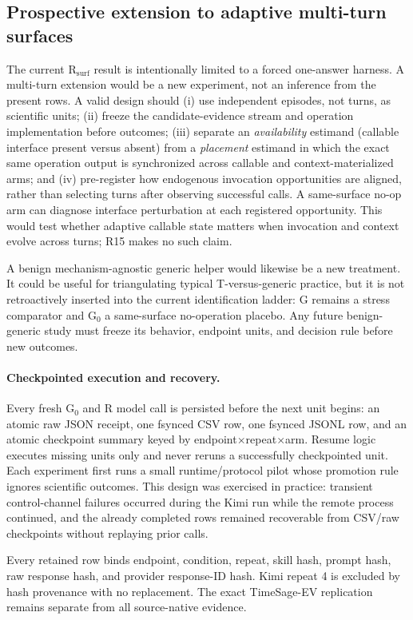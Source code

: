 \subsection{Prospective extension to adaptive multi-turn surfaces}
The current R$_{\mathrm{surf}}$ result is intentionally limited to a forced one-answer harness. A multi-turn extension would be a new experiment, not an inference from the present rows. A valid design should (i) use independent episodes, not turns, as scientific units; (ii) freeze the candidate-evidence stream and operation implementation before outcomes; (iii) separate an \emph{availability} estimand (callable interface present versus absent) from a \emph{placement} estimand in which the exact same operation output is synchronized across callable and context-materialized arms; and (iv) pre-register how endogenous invocation opportunities are aligned, rather than selecting turns after observing successful calls. A same-surface no-op arm can diagnose interface perturbation at each registered opportunity. This would test whether adaptive callable state matters when invocation and context evolve across turns; R15 makes no such claim.

A benign mechanism-agnostic generic helper would likewise be a new treatment. It could be useful for triangulating typical T-versus-generic practice, but it is not retroactively inserted into the current identification ladder: G remains a stress comparator and G$_0$ a same-surface no-operation placebo. Any future benign-generic study must freeze its behavior, endpoint units, and decision rule before new outcomes.

\paragraph{Checkpointed execution and recovery.}
Every fresh G$_0$ and R model call is persisted before the next unit begins: an atomic raw JSON receipt, one fsynced CSV row, one fsynced JSONL row, and an atomic checkpoint summary keyed by endpoint$\times$repeat$\times$arm. Resume logic executes missing units only and never reruns a successfully checkpointed unit. Each experiment first runs a small runtime/protocol pilot whose promotion rule ignores scientific outcomes. This design was exercised in practice: transient control-channel failures occurred during the Kimi run while the remote process continued, and the already completed rows remained recoverable from CSV/raw checkpoints without replaying prior calls.

Every retained row binds endpoint, condition, repeat, skill hash, prompt hash, raw response hash, and provider response-ID hash. Kimi repeat 4 is excluded by hash provenance with no replacement. The exact TimeSage-EV replication remains separate from all source-native evidence.
